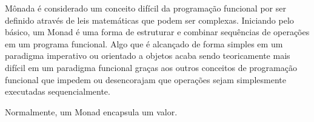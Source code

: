 Mônada é considerado um conceito difícil da programação 
funcional por ser definido através de leis matemáticas 
que podem ser complexas. Iniciando pelo básico, um Monad 
é uma forma de estruturar e combinar sequências de 
operações em um programa funcional. Algo que é alcançado 
de forma simples em um paradigma imperativo ou orientado 
a objetos acaba sendo teoricamente mais difícil em um 
paradigma funcional graças aos outros conceitos de 
programação funcional que impedem ou desencorajam que 
operações sejam simplesmente executadas sequencialmente.

Normalmente, um Monad encapsula um valor.
